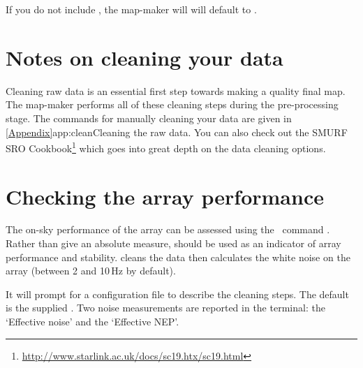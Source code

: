 \documentclass[11pt,oneside,chapters]{starlink}
\begin{document}
\begin{tip}
If you do not include , the map-maker will will
default to .
\end{tip}



\section{Notes on cleaning your data}
\label{sec:clean}

Cleaning raw data is an essential first step towards making a quality
final map. The map-maker performs all of these cleaning steps during
the pre-processing stage. The commands for manually cleaning your data
are given in \cref{Appendix}{app:clean}{Cleaning the raw data}.
You can also check out the SMURF SRO
Cookbook{\footnote{\url{http://www.starlink.ac.uk/docs/sc19.htx/sc19.html}}}
which goes into great depth on the data cleaning options.


\section{Checking the array performance}
\label{sec:calcnoise}

The on-sky performance of the array can be assessed using the \smurf\
command \calcnoise. Rather than give an absolute measure, 
should be used as an indicator of array performance and stability.
\task{calcnoise} cleans the data then calculates the
white noise on the array (between 2 and 10\,Hz by default).
\begin{terminalv}
\end{terminalv}
It will prompt for a configuration file to describe the cleaning
steps. The default is the supplied .
Two noise measurements are reported in the terminal: the
`Effective noise' and the `Effective NEP'.
\end{document}
